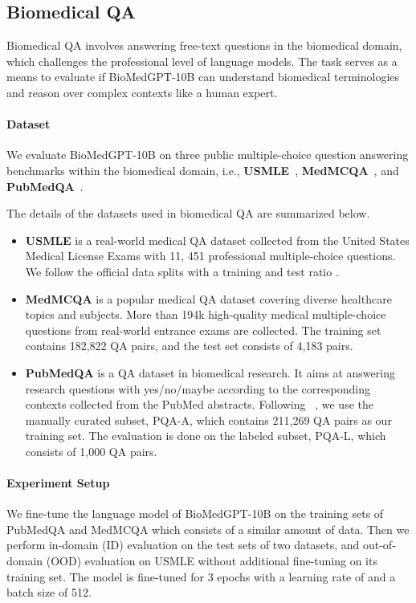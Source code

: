\documentclass{article}
\begin{document}
\subsection{Biomedical QA} 

Biomedical QA involves answering free-text questions in the biomedical domain, which challenges the professional level of language models. The task serves as a means to evaluate if BioMedGPT-10B can understand biomedical terminologies and reason over complex contexts like a human expert.

\paragraph{Dataset}

We evaluate BioMedGPT-10B on three public multiple-choice question answering benchmarks within the biomedical domain, i.e., \textbf{USMLE}~\citep{usmle}, \textbf{MedMCQA}~\citep{medmcqa}, and \textbf{PubMedQA}~\citep{pubmedqa}.



The details of the datasets used in biomedical QA are summarized below.

\begin{itemize}
    
    \item \textbf{USMLE} is a real-world medical QA dataset collected from the United States Medical License Exams with 11, 451 professional multiple-choice questions. We follow the official data splits with a training and test ratio . \item \textbf{MedMCQA} is a popular medical QA dataset covering diverse healthcare topics and subjects. More than 194k high-quality medical multiple-choice questions from real-world entrance exams are collected. The training set contains 182,822 QA pairs, and the test set consists of 4,183 pairs.
    \item \textbf{PubMedQA} is a QA dataset in biomedical research. It aims at answering research questions with yes/no/maybe according to the corresponding contexts collected from the PubMed abstracts. Following ~\citep{pmc}, we use the manually curated subset, PQA-A, which contains 211,269 QA pairs as our training set. The evaluation is done on the labeled subset, PQA-L, which consists of 1,000 QA pairs.
    
\end{itemize}

\paragraph{Experiment Setup} We fine-tune the language model of BioMedGPT-10B on the training sets of PubMedQA and MedMCQA which consists of a similar amount of data. Then we perform in-domain (ID) evaluation on the test sets of two datasets, and out-of-domain (OOD) evaluation on USMLE without additional fine-tuning on its training set. The model is fine-tuned for 3 epochs with a learning rate of  and a batch size of 512. 
\end{document}
